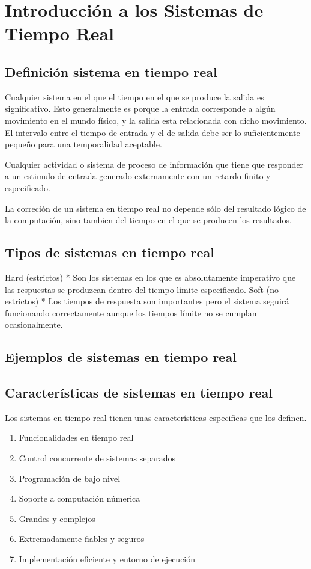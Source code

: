 \section{Introducción a los Sistemas de Tiempo Real}

\subsection{Definición sistema en tiempo real}

Cualquier sistema en el que el tiempo en el que se produce la salida es 
significativo. Esto generalmente es porque la entrada corresponde a algún 
movimiento en el mundo físico, y la salida esta relacionada con dicho 
movimiento. El intervalo entre el tiempo de entrada y el de salida debe ser
lo suficientemente pequeño para una temporalidad aceptable.

Cualquier actividad o sistema de proceso de información que tiene que responder
a un estimulo de entrada generado externamente con un retardo finito y
especificado.

La correción de un sistema en tiempo real no depende sólo del resultado 
lógico de la computación, sino tambien del tiempo en el que se producen los 
resultados.

\subsection{Tipos de sistemas en tiempo real}

	Hard (estrictos) 
		* Son los sistemas en los que es absolutamente imperativo
		que las respuestas se produzcan dentro del tiempo límite
		especificado.
	Soft (no estrictos)
		* Los tiempos de respuesta son importantes pero el sistema
		seguirá funcionando correctamente aunque los tiempos límite
		no se cumplan ocasionalmente.

\subsection{Ejemplos de sistemas en tiempo real}

\subsection{Características de sistemas en tiempo real}

Los sistemas en tiempo real tienen unas características especificas que los
definen.

\begin{enumerate}
\item Funcionalidades en tiempo real
\item Control concurrente de sistemas separados
\item Programación de bajo nivel
\item Soporte a computación númerica
\item Grandes y complejos
\item Extremadamente fiables y seguros
\item Implementación eficiente y entorno de ejecución
\end{enumerate}

